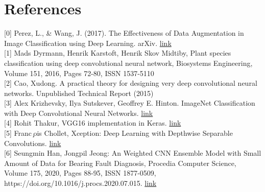 \documentclass[11pt, oneside]{article}
\begin{document}
\section*{References}
[0] Perez, L., \& Wang, J. (2017). The Effectiveness of Data Augmentation in Image Classification using Deep Learning. arXiv. \href{https://doi.org/10.48550/arXiv.1712.04621}{link}\\
{[1]} Mads Dyrmann, Henrik Karstoft, Henrik Skov Midtiby, Plant species classification using deep convolutional neural network, Biosystems Engineering, Volume 151, 2016, Pages 72-80, ISSN 1537-5110 \\
{[2]} Cao, Xudong. A practical theory for designing very deep convolutional neural networks. Unpublished Technical Report (2015) \\
{[3]} Alex Krizhevsky, Ilya Sutskever, Geoffrey E. Hinton. ImageNet Classification with Deep Convolutional Neural Networks. \href{https://proceedings.neurips.cc/paper/2012/file/c399862d3b9d6b76c8436e924a68c45b-Paper.pdf}{link} \\
{[4]} Rohit Thakur, VGG16 implementation in Keras. \href{https://towardsdatascience.com/step-by-step-vgg16-implementation-in-keras-for-beginners-a833c686ae6c}{link}\\
{[5]} Franc ̧ois Chollet, Xception: Deep Learning with Depthwise Separable Convolutions. \href{https://arxiv.org/pdf/1610.02357.pdf}{link}\\
{[6]} Seungmin Han, Jongpil Jeong:
An Weighted CNN Ensemble Model with Small Amount of Data for Bearing Fault Diagnosis, Procedia Computer Science,
Volume 175, 2020, Pages 88-95, ISSN 1877-0509, \\
https://doi.org/10.1016/j.procs.2020.07.015. \href{https://www.sciencedirect.com/science/article/pii/S187705092031694X}{link}
\end{document}
